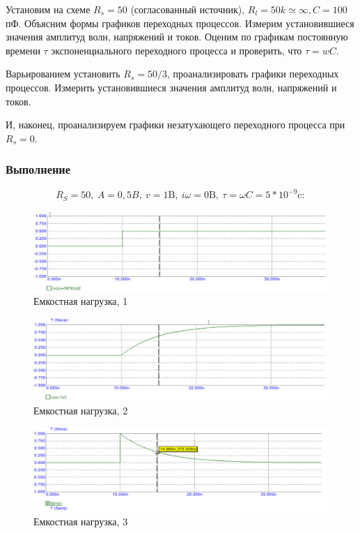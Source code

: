 \documentclass[a4paper, 14pt]{extarticle}%
\begin{document}
Установим на схеме $R_{s}=50$ (согласованный источник), $R_{l}=50 k \simeq \infty, C=100$ пФ. Объясним формы графиков переходных процессов. Измерим установившиеся значения амплитуд волн, напряжений и токов. Оценим по графикам постоянную времени $\tau$ экспоненциального переходного процесса и проверить, что $\tau=w C$.

Варьированием установить $R_{s}=50 / 3$, проанализировать графики переходных процессов. Измерить установившиеся значения амплитуд волн, напряжений и токов.

И, наконец, проанализируем графики незатухающего переходного процесса при $R_{s}=0 .$

\subsubsection{Выполнение}

\[ R_{S}=50,\ A=0,5 B,\ v=1 \text{B},\  i \omega=0 \text{B},\ \tau=\omega C = 5 * 10^{-9} \text{c}:\]

\newpage

\begin{figure}[h!]
			\centering
			\includegraphics[width=1.1\linewidth]{./graphs/20.jpg}
			\caption{Емкостная нагрузка, 1}
			\label{5.1}
\end{figure}

\begin{figure}[h!]
			\centering
			\includegraphics[width=1.1\linewidth]{./graphs/21.jpg}
			\caption{Емкостная нагрузка, 2}
			\label{5.2}
\end{figure}

\begin{figure}[h!]
			\centering
			\includegraphics[width=1.1\linewidth]{./graphs/22.jpg}
			\caption{Емкостная нагрузка, 3}
			\label{5.3}
\end{figure}
\end{document}
